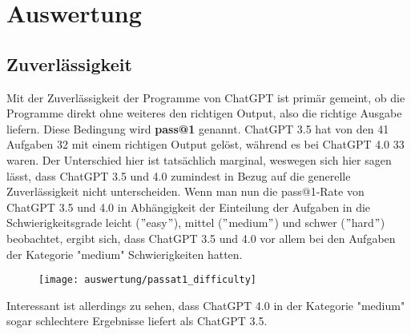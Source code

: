 \documentclass[class=scrbook, crop=false]{standalone}
\begin{document}
\chapter{Auswertung}
\label{ch::auswertung}

\section{Zuverlässigkeit}
\label{sec:zuverleassigkeit}
    Mit der Zuverlässigkeit der Programme von ChatGPT ist primär gemeint, ob die Programme direkt ohne weiteres den
    richtigen Output, also die richtige Ausgabe liefern.
    Diese Bedingung wird \textbf{pass@1} genannt.
    ChatGPT 3.5 hat von den 41 Aufgaben 32 mit einem richtigen Output gelöst, während es bei ChatGPT 4.0 33 waren.
    Der Unterschied hier ist tatsächlich marginal, weswegen sich hier sagen lässt, dass ChatGPT 3.5 und 4.0 zumindest in
    Bezug auf die generelle Zuverlässigkeit nicht unterscheiden.
    Wenn man nun die pass@1-Rate von ChatGPT 3.5 und 4.0 in Abhängigkeit der Einteilung der Aufgaben in die Schwierigkeitsgrade
    leicht (\("\)easy\("\)), mittel (\("\)medium\("\)) und schwer (\("\)hard\("\)) beobachtet, ergibt sich, dass
    ChatGPT 3.5 und 4.0 vor allem bei den Aufgaben der Kategorie "medium" Schwierigkeiten hatten.
    \newline
    \begin{figure}[H]
        \centering
        \texttt{[image: auswertung/passat1\_difficulty]}
        \caption{}
        \label{fig:1}
    \end{figure}

    Interessant ist allerdings zu sehen, dass ChatGPT 4.0 in der Kategorie "medium" sogar schlechtere Ergebnisse liefert als ChatGPT 3.5.
\end{document}

